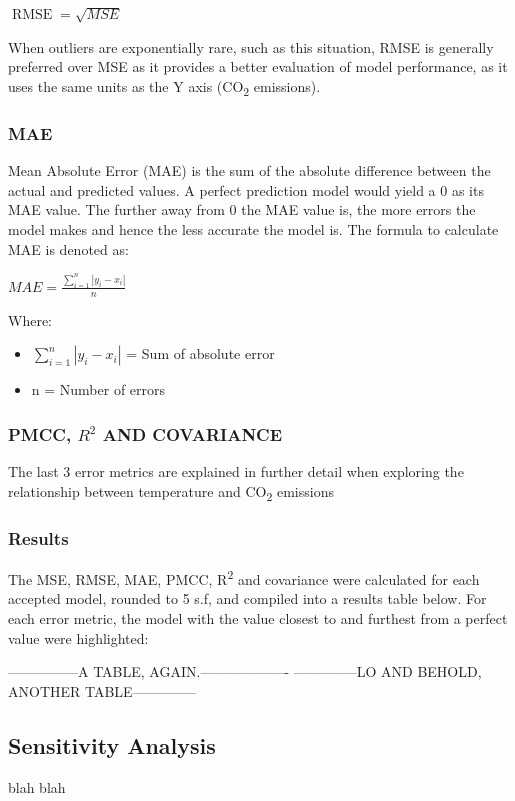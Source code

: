 \documentclass{mcmthesis}
\begin{document}
    ${\operatorname {RMSE} = \sqrt{MSE}}$

    When outliers are exponentially rare, such as this situation, RMSE is generally preferred over MSE as it provides a better evaluation of model performance, as it uses the same units as the Y axis (CO\textsubscript{2} emissions).

    \subsubsection{MAE}
    Mean Absolute Error (MAE) is the sum of the absolute difference between the actual and predicted values. A perfect prediction model would yield a 0 as its MAE value. The further away from 0 the MAE value is, the more errors the model makes and hence the less accurate the model is. The formula to calculate MAE is denoted as:

    ${\displaystyle {MAE} ={\frac {\sum _{i=1}^{n}\left|y_{i}-x_{i}\right|}{n}}}$

    Where:
    \begin{itemize}
        \item ${\sum _{i=1}^{n}\left|y_{i}-x_{i}\right|}$ = Sum of absolute error
        \item {n} = Number of errors
    \end{itemize}

    \subsubsection{PMCC, ${R^2}$ AND COVARIANCE}
    The last 3 error metrics are explained in further detail when exploring the relationship between temperature and CO\textsubscript{2} emissions

    \subsubsection{Results}
    The MSE, RMSE, MAE, PMCC, R\textsuperscript{2} and covariance were calculated for each accepted model, rounded to 5 s.f, and compiled into a results table below. For each error metric, the model with the value closest to and furthest from a perfect value were highlighted:

    ---------------A TABLE, AGAIN.-------------------
    --------------LO AND BEHOLD, ANOTHER TABLE--------------


    \subsection{Sensitivity Analysis}
    blah blah
\end{document}

